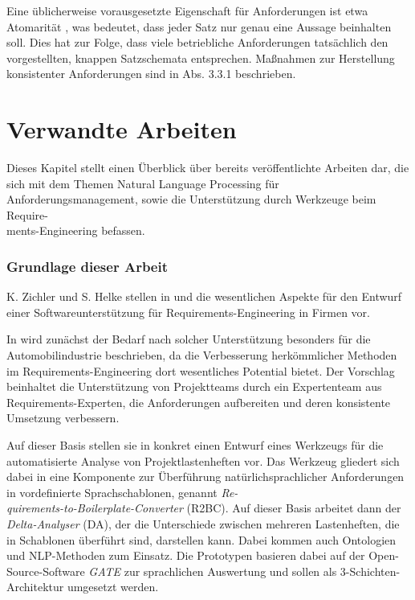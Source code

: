 \documentclass[12pt]{report}
\begin{document}
Eine üblicherweise vorausgesetzte Eigenschaft für Anforderungen ist etwa Atomarität \cite{hp12}, was bedeutet, dass jeder Satz nur genau eine Aussage beinhalten soll. Dies hat zur Folge, dass viele betriebliche Anforderungen tatsächlich den vorgestellten, knappen Satzschemata entsprechen. Maßnahmen zur Herstellung konsistenter Anforderungen sind in Abs. 3.3.1 beschrieben.

\section{Verwandte Arbeiten}
Dieses Kapitel stellt einen Überblick über bereits veröffentlichte Arbeiten dar, die sich mit dem Themen Natural Language Processing für Anforderungsmanagement, sowie die Unterstützung durch Werkzeuge beim Require- \\ments-Engineering befassen. 

\subsubsection{Grundlage dieser Arbeit}
K. Zichler und S. Helke stellen in \cite{zh17} und \cite{zh19} die wesentlichen Aspekte für den Entwurf einer Softwareunterstützung für Requirements-Engineering in Firmen vor. 

In \cite{zh17} wird zunächst der Bedarf nach solcher Unterstützung besonders für die Automobilindustrie beschrieben, da die Verbesserung herkömmlicher Methoden im Requirements-Engineering dort wesentliches Potential bietet. Der Vorschlag beinhaltet die Unterstützung von Projektteams durch ein Expertenteam aus Requirements-Experten, die Anforderungen aufbereiten und deren konsistente Umsetzung verbessern. 

Auf dieser Basis stellen sie in \cite{zh19} konkret einen Entwurf eines Werkzeugs für die automatisierte Analyse von Projektlastenheften vor. Das Werkzeug gliedert sich dabei in eine Komponente zur Überführung natürlichsprachlicher Anforderungen in vordefinierte Sprachschablonen, genannt \textit{Re- \\quirements-to-Boilerplate-Converter} (R2BC). Auf dieser Basis arbeitet dann der \textit{Delta-Analyser} (DA), der die Unterschiede zwischen mehreren Lastenheften, die in Schablonen überführt sind, darstellen kann. Dabei kommen auch Ontologien und NLP-Methoden zum Einsatz. Die Prototypen basieren dabei auf der Open-Source-Software \textit{GATE} zur sprachlichen Auswertung und sollen als 3-Schichten-Architektur umgesetzt werden. 
\end{document}
